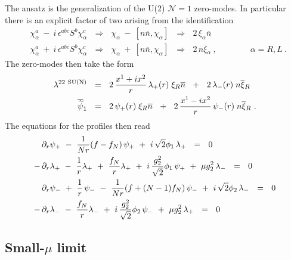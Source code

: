 \documentclass{article}
\newcommand{\p}{\partial}
\newcommand{\wt}{\widetilde}
\newcommand{\ov}{\overline}
\newcommand{\mc}[1]{\mathcal{#1}}
\begin{document}
The ansatz is the generalization of the U(2) $ \mc{N}=1 $ zero-modes. 
In particular there is an explicit factor of two arising from the identification
\begin{align*}
&	\chi_\alpha^a ~-~ i\,\epsilon^{abc} S^b \chi_\alpha^c  ~~~\Longrightarrow~~~ 
				\chi_\alpha ~-~ [ n\ov{n},\chi_\alpha ]
		~~~\Longrightarrow~~~  2\, \xi_\alpha \ov{n} 
	\\
&	\chi_\alpha^a ~+~ i\,\epsilon^{abc} S^b \chi_\alpha^c  ~~~\Longrightarrow~~~ 
				\chi_\alpha ~+~ [ n\ov{n},\chi_\alpha ]
		~~~\Longrightarrow~~~  2\, n\ov{\xi}{}_\alpha
	~,
	\qquad\qquad  \alpha=R,L~.
\end{align*}
The zero-modes then take the form
\begin{align*}
%
	\lambda^{22\ {\rm SU(N)}} & ~~=~~ 2\, \frac{x^1 + ix^2}{r}\, \lambda_+(r) \; \xi_R\ov{n}
				~~+~~  2\, \lambda_-(r)\; n\ov{\xi}{}_R
	\\
%
	\ov{\wt{\psi}}{}_{\dot{1}} & ~~=~~ 2\, \psi_+(r)\; \xi_R \ov{n} 
				~~+~~  2\, \frac{x^1 - i x^2}{r}\, \psi_-(r)\; n\ov{\xi}{}_R~.
\end{align*}
The equations for the profiles then read
\begin{align}
%
\notag
&
	\p_r \psi_+ ~-~ \frac{1}{Nr} (f-f_N)\, \psi_+ ~+~ i\,\sqrt{2}\phi_1\,\lambda_+ ~~=~~ 0
	\\
%
\notag
	-\, & \p_r\lambda_+ ~-~ \frac{1}{r}\lambda_+ ~+~ \frac{f_N}{r}\lambda_+ 
		~+~ i\,\frac{g_2^2}{\sqrt{2}}\phi_1\, \psi_+ ~+~ \mu g_2^2\, \lambda_-  ~~=~~ 0
	\\
%
\label{N1_sorient_eqn}
&
	\p_r \psi_- ~+~ \frac{1}{r}\, \psi_- ~-~ \frac{1}{Nr}(f + (N-1)f_N)\, \psi_- 
							~+~ i\,\sqrt{2}\phi_2\, \lambda_- ~~=~~ 0
	\\
%
\notag
	-\, & \p_r\lambda_- ~-~ \frac{f_N}{r}\lambda_- ~+~ i\,\frac{g_2^2}{\sqrt{2}}\phi_2\, \psi_- 
								~+~ \mu g_2^2\, \lambda_+ ~~=~~ 0
\end{align}

\pagebreak
\subsection{Small-$\mu$ limit}
\end{document}
